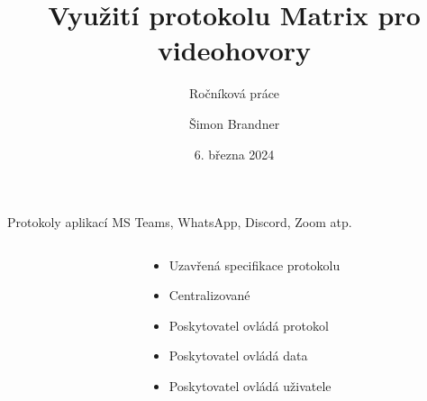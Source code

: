 \documentclass[aspectratio=169]{beamer}
\title{Využití protokolu Matrix pro videohovory}
\subtitle{Ročníková práce}
\author{Šimon Brandner}
\date{6. března 2024}
\begin{document}
\maketitle
\begin{frame}{Protokoly aplikací MS Teams, WhatsApp, Discord, Zoom atp.}
    \pause
    \begin{columns}
        \begin{column}{0.5\textwidth}
            \centering
        \end{column}
        \begin{column}{0.5\textwidth}
            \begin{itemize}[<+->]
                \item Uzavřená specifikace protokolu
                \item Centralizované
                \item Poskytovatel ovládá protokol
                \item Poskytovatel ovládá data
                \item Poskytovatel ovládá uživatele
            \end{itemize}
        \end{column}
    \end{columns}
\end{frame}
\end{document}

